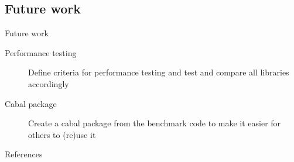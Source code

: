 \documentclass[10pt]{beamer}
\begin{document}
\subsection{Future work}
\begin{frame}{Future work}
	\begin{description}
		\item[Performance testing] Define criteria for performance testing and test and compare all libraries accordingly
		\item[Cabal package] Create a cabal package from the benchmark code to make it easier for others to (re)use it
	\end{description}
\end{frame}

\begin{frame}{References}


\end{frame}
\end{document}
